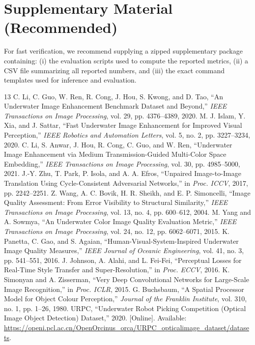 \documentclass[11pt,a4paper]{article}
\begin{document}
\section*{Supplementary Material (Recommended)}
For fast verification, we recommend supplying a zipped supplementary package containing: (i) the evaluation scripts used to compute the reported metrics, (ii) a CSV file summarizing all reported numbers, and (iii) the exact command templates used for inference and evaluation.
\begin{thebibliography}{13}
 C. Li, C. Guo, W. Ren, R. Cong, J. Hou, S. Kwong, and D. Tao, ``An Underwater Image Enhancement Benchmark Dataset and Beyond,'' \emph{IEEE Transactions on Image Processing}, vol. 29, pp. 4376--4389, 2020.
 M. J. Islam, Y. Xia, and J. Sattar, ``Fast Underwater Image Enhancement for Improved Visual Perception,'' \emph{IEEE Robotics and Automation Letters}, vol. 5, no. 2, pp. 3227--3234, 2020.
 C. Li, S. Anwar, J. Hou, R. Cong, C. Guo, and W. Ren, ``Underwater Image Enhancement via Medium Transmission-Guided Multi-Color Space Embedding,'' \emph{IEEE Transactions on Image Processing}, vol. 30, pp. 4985--5000, 2021.
 J.-Y. Zhu, T. Park, P. Isola, and A. A. Efros, ``Unpaired Image-to-Image Translation Using Cycle-Consistent Adversarial Networks,'' in \emph{Proc. ICCV}, 2017, pp. 2242--2251.
 Z. Wang, A. C. Bovik, H. R. Sheikh, and E. P. Simoncelli, ``Image Quality Assessment: From Error Visibility to Structural Similarity,'' \emph{IEEE Transactions on Image Processing}, vol. 13, no. 4, pp. 600--612, 2004.
 M. Yang and A. Sowmya, ``An Underwater Color Image Quality Evaluation Metric,'' \emph{IEEE Transactions on Image Processing}, vol. 24, no. 12, pp. 6062--6071, 2015.
 K. Panetta, C. Gao, and S. Agaian, ``Human-Visual-System-Inspired Underwater Image Quality Measures,'' \emph{IEEE Journal of Oceanic Engineering}, vol. 41, no. 3, pp. 541--551, 2016.
 J. Johnson, A. Alahi, and L. Fei-Fei, ``Perceptual Losses for Real-Time Style Transfer and Super-Resolution,'' in \emph{Proc. ECCV}, 2016.
 K. Simonyan and A. Zisserman, ``Very Deep Convolutional Networks for Large-Scale Image Recognition,'' in \emph{Proc. ICLR}, 2015.
 G. Buchsbaum, ``A Spatial Processor Model for Object Colour Perception,'' \emph{Journal of the Franklin Institute}, vol. 310, no. 1, pp. 1--26, 1980.
 URPC, ``Underwater Robot Picking Competition (Optical Image Object Detection) Dataset,'' 2020. [Online]. Available: \url{https://openi.pcl.ac.cn/OpenOrcinus_orca/URPC_opticalimage_dataset/datasets}.
\end{thebibliography}
\end{document}
